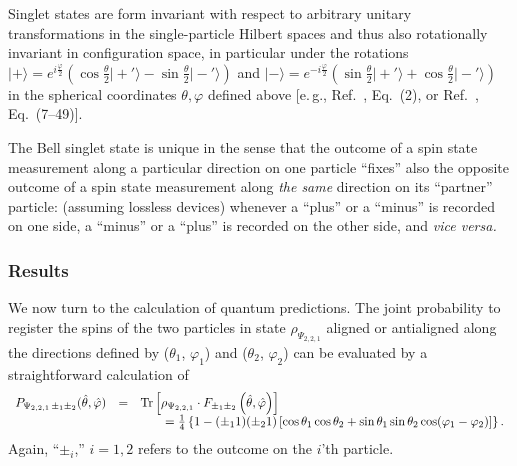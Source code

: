 \documentclass[pra,amsfonts,showpacs,showkeys,preprint]{revtex4}
\begin{document}
Singlet states are form invariant with respect to arbitrary unitary
transformations in the single-particle Hilbert spaces and thus
also rotationally invariant in configuration space,
in particular under the rotations
$
\vert + \rangle =
e^{ i{\frac{\varphi}{2}} }
\left(
\cos \frac{\theta}{2} \vert +'  \rangle
-
\sin \frac{\theta}{2} \vert -'   \rangle
\right)
$
and
$
\vert - \rangle =
e^{ -i{\frac{\varphi}{2}} }
\left(
\sin \frac{\theta}{2} \vert +'   \rangle
+
\cos \frac{\theta}{2} \vert -'  \rangle
\right)
$
in the spherical coordinates $\theta , \varphi$ defined above
[e.\,g., Ref.~\cite{krenn1}, Eq.~(2), or Ref.~\cite{ba-89}, Eq.~(7--49)].

The Bell singlet state is unique in the sense that the outcome of a spin state measurement
along a particular direction on one particle ``fixes'' also the opposite outcome of a spin state measurement
along {\em the same} direction on its ``partner'' particle: (assuming lossless devices)
whenever a ``plus'' or a ``minus'' is recorded on one side,
a ``minus'' or a ``plus'' is recorded on the other side, and {\it vice versa.}




\subsubsection*{Results}

We now turn to the calculation of quantum predictions.
The joint probability to register the spins of the two particles
in state $\rho_{\Psi_{2,2,1}}$
aligned or antialigned along the directions defined by
($\theta_1$, $\varphi_1 $) and
($\theta_2$, $\varphi_2 $)
can be evaluated by a straightforward calculation of
\begin{equation}
\begin{array}{rcl}
P_{{ \Psi_{2,2,1}}\,\pm_1 \pm_2 } ({\hat \theta},{\hat \varphi} )&=&
{\rm Tr}\left[\rho_{ \Psi_{2,2,1}} \cdot F_{\pm_1 \pm_2 } \left({\hat \theta},{\hat \varphi} \right)\right] \\
&&\qquad
=\frac{1}{4} \left\{ 1-(\pm_1 1)( \pm_2 1) \left[\cos \theta_1 \cos \theta_2 + \sin \theta_1 \sin \theta_2 \cos (\varphi_1-\varphi_2) \right]\right\}
.
\end{array}
\end{equation}
Again, ``$\pm_i$,'' $i=1,2$ refers to the outcome on the $i$'th particle.
\end{document}
